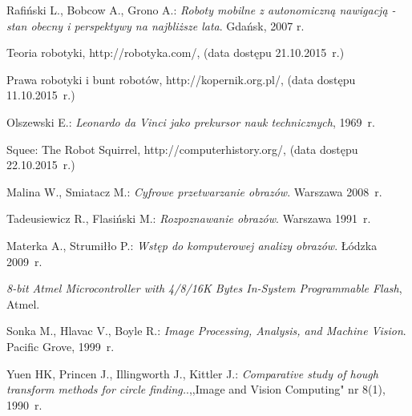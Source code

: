 \begin{thebibliography}{9}

Rafiński L., Bobcow A., Grono A.: \emph{Roboty mobilne z autonomiczną nawigacją - stan obecny i perspektywy na najbliższe lata}. Gdańsk, 2007 r.  

Teoria robotyki, http://robotyka.com/, (data dostępu 21.10.2015~r.)

Prawa robotyki i bunt robotów, http://kopernik.org.pl/, (data dostępu 11.10.2015~r.)

Olszewski E.: \emph{Leonardo da Vinci jako prekursor nauk technicznych}, 1969~r.

Squee: The Robot Squirrel, http://computerhistory.org/, (data dostępu 22.10.2015~r.)

Malina W., Smiatacz M.: \emph{Cyfrowe przetwarzanie obrazów}. Warszawa 2008~r.

Tadeusiewicz R., Flasiński M.: \emph{Rozpoznawanie obrazów}. Warszawa 1991~r.

Materka A., Strumiłło P.: \emph{Wstęp do komputerowej analizy obrazów}. Łódzka 2009~r.

\emph{8-bit Atmel Microcontroller with 4/8/16K Bytes In-System Programmable Flash}, Atmel.

Sonka M., Hlavac V., Boyle R.: \emph{Image Processing, Analysis, and Machine Vision}. Pacific Grove, 1999~r.

Yuen HK, Princen J., Illingworth J., Kittler J.: \emph{Comparative study of hough transform methods for circle finding.}.,,Image and Vision Computing" nr 8(1), 1990~r.

\end{thebibliography}
